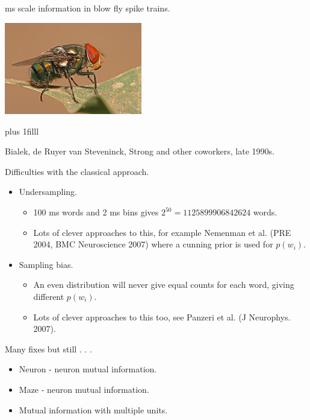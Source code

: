 \documentclass{beamer}
\newcommand{\btVFill}{\vskip0pt plus 1filll}
\begin{document}
\begin{frame}{ms scale information in blow fly spike trains.}
\begin{center}
\includegraphics[width=6cm]{blow_fly.jpg}
\end{center}
\btVFill
\begin{flushright}
  \color{gray}
\tiny{Bialek, de Ruyer van Steveninck, Strong and other coworkers, late 1990s.}
\color{black}
\end{flushright}
\end{frame}



\begin{frame}{Difficulties with the classical approach.}
\begin{itemize}
\item Undersampling. 
\begin{itemize}
\item 100 ms words and 2 ms bins gives $2^{50}=1125899906842624$ words.
\item Lots of clever approaches to this, for example Nemenman et al. (PRE 2004, BMC Neuroscience 2007) where a cunning prior is used for $p(w_i)$.
\end{itemize}
\item Sampling bias.
\begin{itemize}
\item An even distribution will never give equal counts for each word,
  giving different $p(w_i)$.
\item Lots of clever approaches to this too, see Panzeri et al. (J Neurophys. 2007).
\end{itemize}
\end{itemize}
\end{frame}

\begin{frame}{Many fixes but still . . . }
\begin{itemize}
\item Neuron - neuron mutual information.
\item Maze - neuron mutual information.
\item Mutual information with multiple units.
\end{itemize}
\end{frame}
\end{document}
